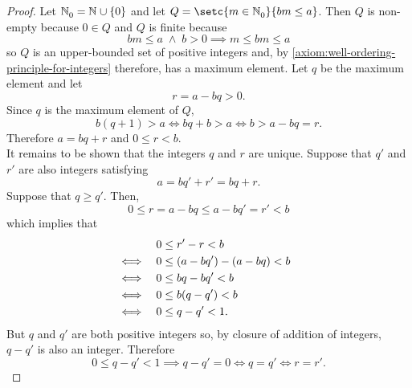 \documentclass[../MathsNotesBase.tex]{subfiles}
\begin{document}
{\begin{proof}
			Let ${ \mathbb{N}^{}_0 = \mathbb{N}^{} \cup \{0\} }$ and let ${ Q = \setc{m \in \N{}_0}{bm \leq a} }$. Then $Q$ is non-empty because ${ 0 \in Q }$ and $Q$ is finite because
			\[ bm \leq a \; \land \; b > 0 \implies m \leq bm \leq a \]
			so $Q$ is an upper-bounded set of positive integers and, by \ref{axiom:well-ordering-principle-for-integers} therefore, has a maximum element. Let $q$ be the maximum element and let 
			\[ r = a - bq > 0. \]
			Since $q$ is the maximum element of $Q$,
			\[ b(q+1) > a \iff bq + b > a \iff b > a - bq = r. \]
			Therefore ${ a = bq + r }$ and ${ 0 \leq r < b }$.\\
			
			It remains to be shown that the integers $q$ and $r$ are unique. Suppose that $q'$ and $r'$ are also integers satisfying
			\[ a = bq' + r' = bq + r. \]
			Suppose \WLOG that ${ q \geq q' }$. Then,
			\[ 0 \leq r = a - bq \leq a - bq' = r' < b \]
			which implies that
			\[\begin{aligned}
				&& 0 &\leq r' - r < b \\
				&\iff & 0 &\leq (a - bq') - (a - bq) < b &\text{\scriptsize{}} \\
				&\iff & 0 &\leq bq - bq' < b \\
				&\iff & 0 &\leq b(q - q') < b \\
				&\iff & 0 &\leq q - q' < 1.
			\end{aligned}\]
			But $q$ and $q'$ are both positive integers so, by closure of addition of integers, ${ q - q' }$ is also an integer. Therefore
			\[ 0 \leq q - q' < 1 \implies q - q' = 0 \iff q = q' \iff r = r'. \]
		\end{proof}
	
		
		\biggerskip
		\nl[4]
		
}
\end{document}
